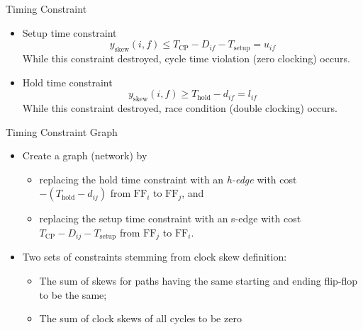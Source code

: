 \documentclass[10pt,ignorenonframetext,mathserif]{beamer}
\providecommand{\tightlist}{%
  \setlength{\itemsep}{0pt}\setlength{\parskip}{0pt}}
\begin{document}
\begin{frame}{Timing Constraint}

\begin{itemize}
\tightlist
\item
  Setup time constraint
  \[y_\text{skew}(i,f) \le T_\text{CP} - D_{if} - T_\text{setup} = u_{if}\] While this
  constraint destroyed, cycle time violation (zero clocking) occurs.
\item
  Hold time constraint \[y_\text{skew}(i,f) \ge T_\text{hold} - d_{if} = l_{if}\]
  While this constraint destroyed, race condition (double clocking)
  occurs.
\end{itemize}

\end{frame}

\begin{frame}{Timing Constraint Graph}

\begin{itemize}
\tightlist
\item
  Create a graph (network) by

  \begin{itemize}
  \tightlist
  \item
    replacing the hold time constraint with an \emph{h-edge} with cost
    \(-(T_\text{hold} - d_{ij})\) from \(\text{FF}_i\) to \(\text{FF}_j\), and
  \item
    replacing the setup time constraint with an s-edge with cost
    \(T_\text{CP} - D_{ij} - T_\text{setup}\) from \(\text{FF}_j\) to \(\text{FF}_i\).
  \end{itemize}
\item
  Two sets of constraints stemming from clock skew definition:

  \begin{itemize}
  \tightlist
  \item
    The sum of skews for paths having the same starting and ending
    flip-flop to be the same;
  \item
    The sum of clock skews of all cycles to be zero
  \end{itemize}
\end{itemize}

\end{frame}
\end{document}
